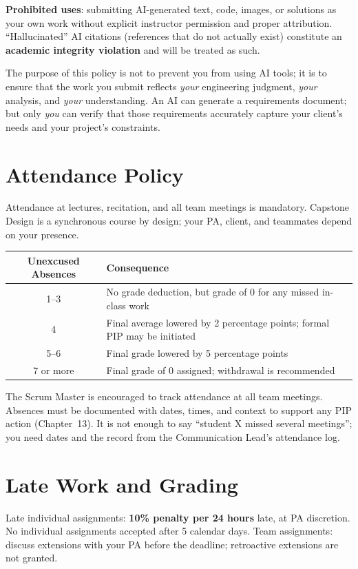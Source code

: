 \textbf{Prohibited uses}: submitting AI-generated text, code, images, or solutions as your own work without explicit instructor permission and proper attribution. ``Hallucinated'' AI citations (references that do not actually exist) constitute an \textbf{academic integrity violation} and will be treated as such.

The purpose of this policy is not to prevent you from using AI tools; it is to ensure that the work you submit reflects \emph{your} engineering judgment, \emph{your} analysis, and \emph{your} understanding. An AI can generate a requirements document; but only \emph{you} can verify that those requirements accurately capture your client's needs and your project's constraints.

\section{Attendance Policy}
Attendance at lectures, recitation, and all team meetings is mandatory. Capstone Design is a synchronous course by design; your PA, client, and teammates depend on your presence.

\begin{center}\small
\begin{tabularx}{\textwidth}{cX}
\toprule
\textbf{Unexcused Absences} & \textbf{Consequence} \\
\midrule
1--3 & No grade deduction, but grade of 0 for any missed in-class work \\
4 & Final average lowered by 2 percentage points; formal PIP may be initiated \\
5--6 & Final grade lowered by 5 percentage points \\
7 or more & Final grade of 0 assigned; withdrawal is recommended \\
\bottomrule
\end{tabularx}
\end{center}

The Scrum Master is encouraged to track attendance at all team meetings. Absences must be documented with dates, times, and context to support any PIP action (Chapter~13). It is not enough to say ``student X missed several meetings''; you need dates and the record from the Communication Lead's attendance log.

\section{Late Work and Grading}
Late individual assignments: \textbf{10\% penalty per 24 hours} late, at PA discretion. No individual assignments accepted after 5 calendar days. Team assignments: discuss extensions with your PA before the deadline; retroactive extensions are not granted.

